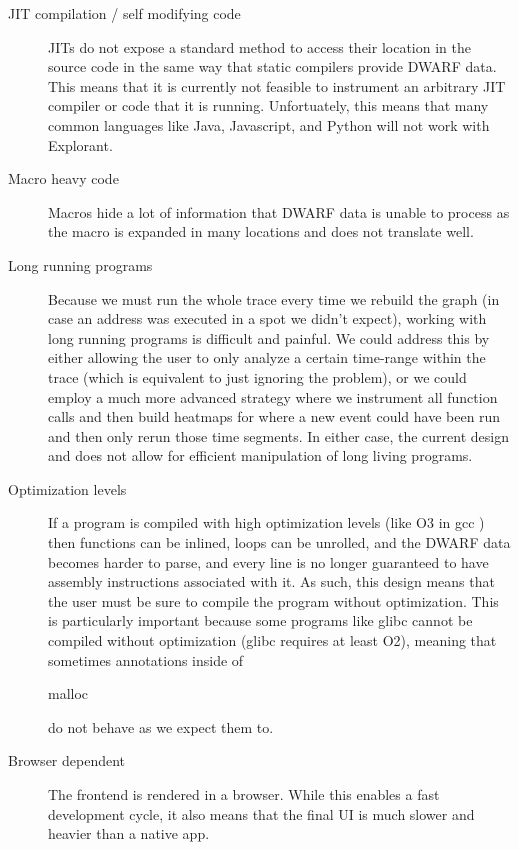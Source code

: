 \begin{description}
    \item[JIT compilation / self modifying code] JITs \cite{jit} do not expose a standard method to access their location in the source code in the same way that static compilers provide DWARF data. This means that it is currently not feasible to instrument an arbitrary JIT compiler or code that it is running. Unfortuately, this means that many common languages like Java, Javascript, and Python will not work with Explorant.
\item[Macro heavy code] Macros hide a lot of information that DWARF data is unable to process as the macro is expanded in many locations and does not translate well. 
\item[Long running programs] Because we must run the whole trace every time we rebuild the graph (in case an address was executed in a spot we didn't expect), working with long running programs is difficult and painful. We could address this by either allowing the user to only analyze a certain time-range within the trace (which is equivalent to just ignoring the problem), or we could employ a much more advanced strategy where we instrument all function calls and then build heatmaps for where a new event could have been run and then only rerun those time segments. In either case, the current design and does not allow for efficient manipulation of long living programs. 
\item[Optimization levels] If a program is compiled with high optimization levels (like O3 in gcc \cite{gcc}) then functions can be inlined, loops can be unrolled, and the DWARF data becomes harder to parse, and every line is no longer guaranteed to have assembly instructions associated with it. As such, this design means that the user must be sure to compile the program without optimization. This is particularly important because some programs like glibc cannot be compiled without optimization (glibc requires at least O2), meaning that sometimes annotations inside of \begin{tt}malloc\end{tt} do not behave as we expect them to. 
\item[Browser dependent] The frontend is rendered in a browser. While this enables a fast development cycle, it also means that the final UI is much slower and heavier than a native app. 

\end{description}
